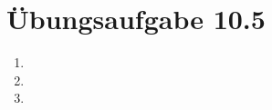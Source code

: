 \documentclass[a4paper]{scrartcl}
\begin{document}
\section*{Übungsaufgabe 10.5} 
\begin{enumerate}
    \item

    \item

    \item

\end{enumerate}
\end{document}

